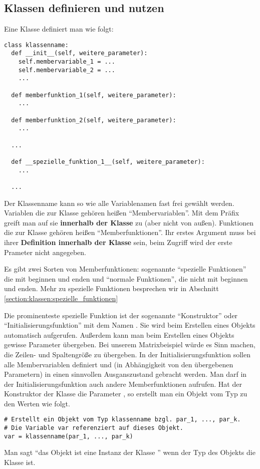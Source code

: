 \subsection{Klassen definieren und nutzen}
\label{section:klassen:klassen_definieren_und_nutzen}
Eine Klasse definiert man \Python wie folgt:
\begin{lstlisting}
class klassenname:
  def __init__(self, weitere_parameter):
    self.membervariable_1 = ...
    self.membervariable_2 = ...
    ...
  
  def memberfunktion_1(self, weitere_parameter):
    ...
  
  def memberfunktion_2(self, weitere_parameter):
    ...
  
  ...
  
  def __spezielle_funktion_1__(self, weitere_parameter):
    ...
  
  ...
\end{lstlisting}
Der Klassenname kann so wie alle Variablenamen fast frei gewählt werden.
Variablen die zur Klasse gehören heißen ``Membervariablen''.
Mit dem Präfix  greift man auf sie {\bfseries innerhalb der Klasse} zu (aber nicht von außen).
Funktionen die zur Klasse gehören heißen ``Memberfunktionen''.
Ihr erstes Argument muss bei ihrer {\bfseries Definition innerhalb der Klasse}  sein, beim Zugriff wird der erste Prameter  nicht angegeben.

Es gibt zwei Sorten von Memberfunktionen:
sogenannte ``spezielle Funktionen'' die mit \lpy{__} beginnen und enden und
``normale Funktionen'', die nicht mit \lpy{__} beginnen und enden.
Mehr zu spezielle Funktionen besprechen wir in Abschnitt \ref{section:klassen:spezielle_funktionen}

Die prominenteste spezielle Funktion ist der sogenannte ``Konstruktor'' oder ``Initialisierungsfunktion'' mit dem Namen .
Sie wird beim Erstellen eines Objekts automatisch aufgerufen.
Außerdem kann man beim Erstellen eines Objekts gewisse Parameter übergeben.
Bei unserem Matrixbeispiel würde es Sinn machen, die Zeilen- und Spaltengröße zu übergeben.
In der Initialisierungsfunktion sollen alle Membervariablen definiert und (in Abhängigkeit von den übergebenen Parametern) in einen sinnvollen Ausganszustand gebracht werden.
Man darf in der Initialisierungsfunktion auch andere Memberfunktionen aufrufen.
Hat der Konstruktor der Klasse  die Parameter ,
so erstellt man ein Objekt vom Typ  zu den Werten  wie folgt.
\begin{lstlisting}
# Erstellt ein Objekt vom Typ klassenname bzgl. par_1, ..., par_k.
# Die Variable var referenziert auf dieses Objekt.
var = klassenname(par_1, ..., par_k)
\end{lstlisting}
Man sagt ``das Objekt  ist eine Instanz der Klasse '' wenn der Typ des Objekts  die Klasse  ist.


